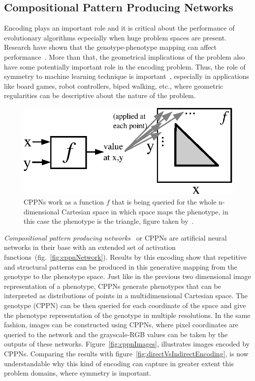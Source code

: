 \subsection{Compositional Pattern Producing Networks}

Encoding plays an important role and it is critical about the performance of evolutionary algorithms ecpecially when huge problem spaces are present. Research have shown that the genotype-phenotype mapping can affect performance~\cite{komosinski2001comparison}. More than that, the geometrical implications of the problem also have some potentially important role in the encoding problem. Thus, the role of symmetry to machine learning technique is important~\cite{gauci:aaai08}, especially in applications like board games, robot controllers, biped walking, etc., where geometric regularities can be descriptive about the nature of the problem.

\begin{figure}[t!]
\centering
\includegraphics{../Figures/Misc/cppnResolution.eps}
\caption{CPPNs work as a function $f$ that is being queried for the whole n-dimensional Cartesian space in which space maps the phenotype, in this case the phenotype is the triangle, figure taken by~\cite{stanley2007compositional}.}
\label{fig:cppnResolution}
\end{figure}

\emph{Compositional pattern producing networks}~\cite{stanley2007compositional} or CPPNs are artificial neural networks in their base with an extended set of activation functions~(fig.~\ref{fig:cppnNetwork}). Results by this encoding show that repetitive and structural patterns can be produced in this generative mapping from the genotype to the phenotype space. Just like in the previous two dimensional image representation of a phenotype, CPPNs generate phenotypes that can be interpreted as distributions of points in a multidimensional Cartesian space. The genotype (CPPN) can be then queried for each coordinate of the space and give the phenotype representation of the genotype in multiple resolutions. In the same fashion, images can be constructed using CPPNs, where pixel coordinates are queried to the network and the grayscale-RGB values can be taken by the outputs of these networks. Figure~\ref{fig:cppnImages}, illustrates images encoded by CPPNs. Comparing the results with figure~\ref{fig:directVsIndirectEncoding}, is now understandable why this kind of encoding can capture in greater extent this problem domains, where symmetry is important.

